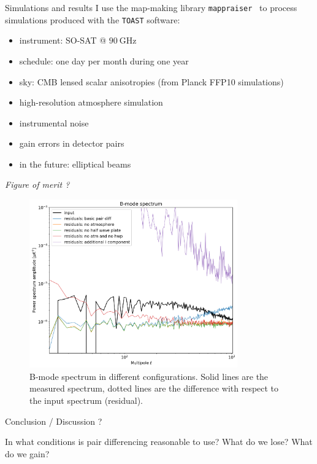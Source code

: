 \documentclass[final]{beamer}
\newlength{\colwidth}
\begin{document}
\begin{frame}[t]
\begin{columns}[t]
\begin{column}{\colwidth}
\begin{block}{Simulations and results}
        I use the map-making library \texttt{mappraiser}~\cite{ElBouhargani:2021umq} to process simulations produced with the \texttt{TOAST} software:

        \begin{itemize}
          \item instrument: SO-SAT @ $\qty[mode=text]{90}{\giga\hertz}$
          \item schedule: one day per month during one year
          \item sky: CMB lensed scalar anisotropies (from Planck FFP10 simulations)
          \item high-resolution atmosphere simulation
          \item instrumental noise
          \item gain errors in detector pairs
          \item in the future: elliptical beams
        \end{itemize}

        \emph{Figure of merit ?}

        \begin{figure}
          \centering
          \includegraphics[width=0.8\textwidth]{figures/comparison.png}
          \caption{B-mode spectrum in different configurations. Solid lines are the measured spectrum, dotted lines are the difference with respect to the input spectrum (residual).}
        \end{figure}
      \end{block}

      \begin{block}{Conclusion / Discussion ?}

        In what conditions is pair differencing reasonable to use?
        What do we lose? What do we gain?


\end{block}
\end{column}
\end{columns}
\end{frame}
\end{document}
